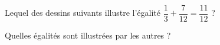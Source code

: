 
\begin{exercice}\label{exosmath-0844}

    Lequel des dessins suivants illustre l'égalité \( \dfrac{ 1 }{ 3 }+\dfrac{ 7 }{ 12 }=\dfrac{ 11 }{ 12 }\) ?

\begin{center}
   
   
   
\end{center}
Quelles égalités sont illustrées par les autres ?

\end{exercice}
